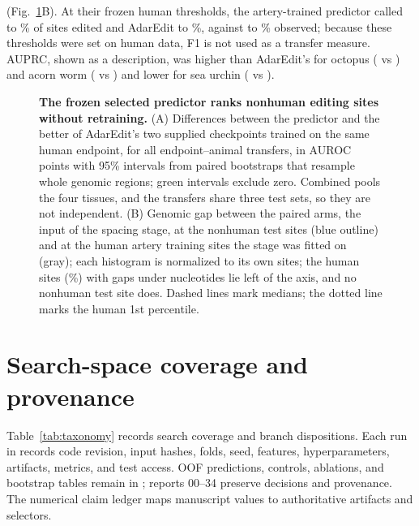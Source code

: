 \documentclass[9pt,twoside]{pnas-new}
\begin{document}
(Fig.~\ref{fig:s-nonhuman}B). At their frozen human thresholds, the artery-trained predictor called \NonhumanCalledSelectedMin{} to \NonhumanCalledSelectedMax{}\% of sites edited and AdarEdit \NonhumanCalledAdarEditMin{} to \NonhumanCalledAdarEditMax{}\%, against \NonhumanCalledObservedMin{} to \NonhumanCalledObservedMax{}\% observed; because these thresholds were set on human data, F1 is not used as a transfer measure. AUPRC, shown as a description, was higher than AdarEdit's for octopus (\NonhumanAUPRCSelectedOctopus{} vs \NonhumanAUPRCAdarEditOctopus{}) and acorn worm (\NonhumanAUPRCSelectedPtychodera{} vs \NonhumanAUPRCAdarEditPtychodera{}) and lower for sea urchin (\NonhumanAUPRCSelectedStrongylocentrotus{} vs \NonhumanAUPRCAdarEditStrongylocentrotus{}).



\begin{figure}[H]
\centering

\caption{\textbf{The frozen selected predictor ranks nonhuman editing sites without retraining.} (A) Differences between the predictor and the better of AdarEdit's two supplied checkpoints trained on the same human endpoint, for all \NonhumanTransferCount{} endpoint--animal transfers, in AUROC points with 95\% intervals from paired bootstraps that resample whole genomic regions; green intervals exclude zero. Combined pools the four tissues, and the \NonhumanTransferCount{} transfers share three test sets, so they are not independent. (B) Genomic gap between the paired arms, the input of the spacing stage, at the nonhuman test sites (blue outline) and at the human artery training sites the stage was fitted on (gray); each histogram is normalized to its own sites; the \NonhumanHumanBelowAxisSites{} human sites (\NonhumanHumanBelowAxisPercent{}\%) with gaps under \NonhumanGapAxisMin{} nucleotides lie left of the axis, and no nonhuman test site does. Dashed lines mark medians; the dotted line marks the human 1st percentile.}
\label{fig:s-nonhuman}
\end{figure}

\section{Search-space coverage and provenance}\label{si:coverage}

Table~\ref{tab:taxonomy} records search coverage and branch dispositions. Each run in  records code revision, input hashes, folds, seed, features, hyperparameters, artifacts, metrics, and test access. OOF predictions, controls, ablations, and bootstrap tables remain in ; reports 00--34 preserve decisions and provenance. The numerical claim ledger maps manuscript values to authoritative artifacts and selectors.
\end{document}
